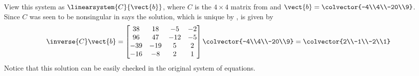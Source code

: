 View this system as $\linearsystem{C}{\vect{b}}$, where $C$ is the $4\times 4$ matrix from  and $\vect{b}=\colvector{-4\\4\\-20\\9}$.
Since $C$ was seen to be nonsingular in   says the  solution, which is unique by , is given by
%
\begin{equation*}
\inverse{C}\vect{b}=
\begin{bmatrix}
38 & 18 & -5 & -2\\
96 & 47 & -12 & -5\\
-39 & -19 & 5 & 2\\
-16 & -8 & 2 & 1
\end{bmatrix}
\colvector{-4\\4\\-20\\9}
=
\colvector{2\\-1\\-2\\1}
\end{equation*}
%
Notice that this solution can be easily checked in the original system of equations.
